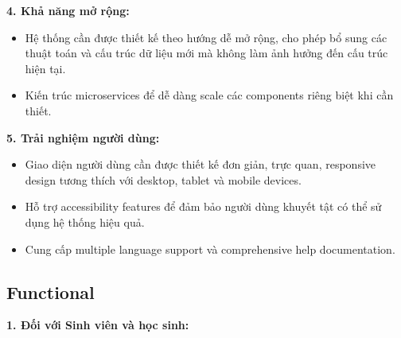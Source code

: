 \textbf{4. Khả năng mở rộng:}
\begin{itemize}
\item Hệ thống cần được thiết kế theo hướng dễ mở rộng, cho phép bổ sung các thuật toán và cấu trúc dữ liệu mới mà không làm ảnh hưởng đến cấu trúc hiện tại.
\item Kiến trúc microservices để dễ dàng scale các components riêng biệt khi cần thiết.
\end{itemize}

\textbf{5. Trải nghiệm người dùng:}
\begin{itemize}
\item Giao diện người dùng cần được thiết kế đơn giản, trực quan, responsive design tương thích với desktop, tablet và mobile devices.
\item Hỗ trợ accessibility features để đảm bảo người dùng khuyết tật có thể sử dụng hệ thống hiệu quả.
\item Cung cấp multiple language support và comprehensive help documentation.
\end{itemize}

\subsection{Functional}

\textbf{1. Đối với Sinh viên và học sinh:}


